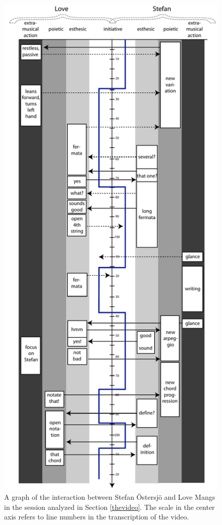 \documentclass[10pt,letterpaper]{article}
\begin{document}
\begin{figure}[!ht]
\begin{center}
\includegraphics[width=0.8\columnwidth]{img/timeline_horiz}
\caption{A graph of the interaction between Stefan \"{O}stersj\"{o} and
 Love Mangs in the session analyzed in Section \ref{thevideo}. The scale
 in the center axis refers to line numbers in the transcription of the video.} \label{graph}
\end{center}
\end{figure}
\end{document}
